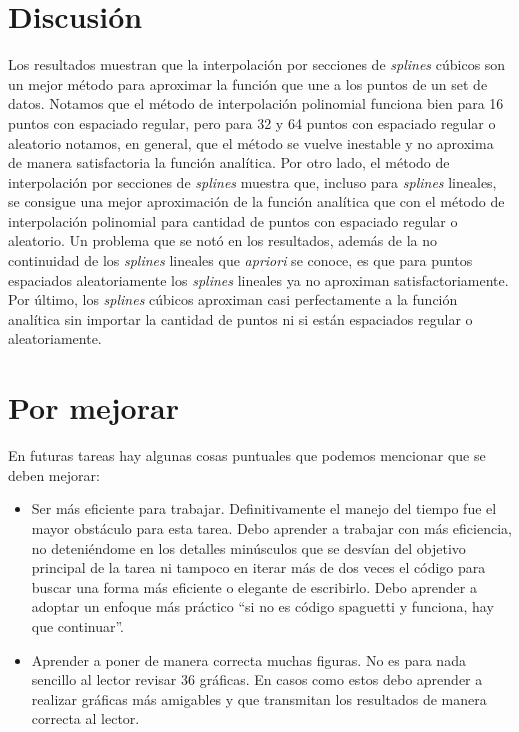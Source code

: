 \documentclass[11pt,letterpaper]{article}
\begin{document}
\section{Discusión}
Los resultados muestran que la interpolación por secciones de \textit{splines} cúbicos
son un mejor método para aproximar la función que une a los puntos de un set de 
datos. Notamos que el método de interpolación polinomial 
funciona bien para 16 puntos con espaciado regular, pero para 32 y 64
puntos con espaciado regular o aleatorio notamos, en general, que el 
método se vuelve inestable y no aproxima de manera satisfactoria la función
analítica. Por otro lado, el método de interpolación por secciones de
\textit{splines} muestra que, incluso para \textit{splines} lineales, se consigue
una mejor aproximación de la función analítica que con el método de 
interpolación polinomial para cantidad de puntos con espaciado regular
o aleatorio. Un problema que se notó en los resultados, además de 
la no continuidad de los \textit{splines} lineales que \textit{apriori}
se conoce, es que para puntos espaciados aleatoriamente los \textit{splines}
lineales ya no aproximan satisfactoriamente. Por último, los \textit{splines}
cúbicos aproximan casi perfectamente a la función analítica sin importar
la cantidad de puntos ni si están espaciados regular o aleatoriamente.

\section{Por mejorar}
En futuras tareas hay algunas cosas puntuales que podemos mencionar
que se deben mejorar: 
\begin{itemize}
\item Ser más eficiente para trabajar. Definitivamente el manejo del tiempo 
fue el mayor obstáculo para esta tarea. Debo aprender a trabajar con 
más eficiencia, no deteniéndome en los detalles minúsculos que se desvían 
del objetivo principal de la tarea ni tampoco en iterar más de dos veces el código
para buscar una forma más eficiente o elegante de escribirlo. Debo aprender
a adoptar un enfoque más práctico ``si no es código spaguetti y funciona, hay
que continuar''.
\item Aprender a poner de manera correcta muchas figuras. No es para nada 
sencillo al lector revisar 36 gráficas. En casos como estos debo aprender 
a realizar gráficas más amigables y que transmitan los resultados de manera
correcta al lector.
\end{itemize}



\end{document}
